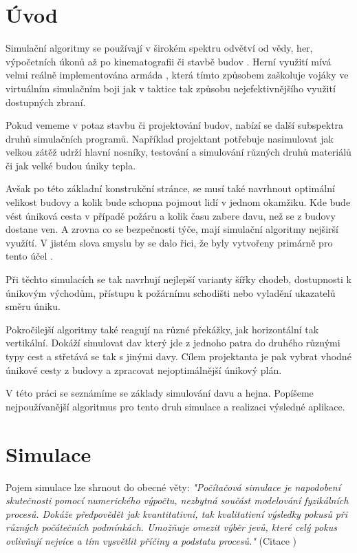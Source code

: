 \documentclass[czech,public,dept460,male,cpdeclaration]{diploma}
\begin{document}
\MakeTitlePages

\lstlistoflistings

\section{Úvod}
Simulační algoritmy se používají v širokém spektru odvětví od vědy, her, výpočetních úkonů až po kinematografii či stavbě budov \cite{linkToBuildingSimulation}. Herní využití mívá velmi reálně implementována armáda \cite{linkToArmySimulation}, která tímto způsobem zaškoluje vojáky ve virtuálním simulačním boji jak v taktice tak způsobu nejefektivnějšího využití dostupných zbraní. 

Pokud vememe v potaz stavbu či projektování budov, nabízí se další subspektra  druhů simulačních programů. Například projektant potřebuje nasimulovat jak velkou zátěž udrží hlavní nosníky, testování a simulování různých druhů materiálů či jak velké budou úniky tepla.

Avšak po této základní konstrukční stránce, se musí také navrhnout optimální velikost budovy a kolik bude schopna pojmout lidí v jednom okamžiku. Kde bude vést úniková cesta v případě požáru a kolik času zabere davu, než se z budovy dostane ven. A zrovna co se bezpečnosti týče, mají simulační algoritmy nejširší využítí. V jistém slova smyslu by se dalo řici, že byly vytvořeny primárně pro tento účel \cite{link1}.

Při těchto simulacích se tak navrhují nejlepší varianty šířky chodeb, dostupnosti k únikovým východům, přístupu k požárnímu schodišti nebo vyladění ukazatelů směru
úniku.

Pokročilejší algoritmy také reagují na různé překážky, jak horizontální tak vertikální. Dokáží simulovat dav který jde z jednoho patra do druhého různými typy cest a střetává se tak s jinými davy. Cílem projektanta je pak vybrat vhodné únikové cesty z budovy a zpracovat nejoptimálnější únikový plán.

V této práci se seznámíme se základy simulování davu a hejna. Popíšeme nejpoužívanější algoritmus \cite{link2} pro tento druh simulace a realizaci výsledné aplikace.

\section{Simulace}
Pojem simulace lze shrnout do obecné věty: \textit{"Počítačová simulace je napodobení skutečnosti pomocí numerického výpočtu, nezbytná součást modelování fyzikálních procesů. Dokáže předpovědět jak kvantitativní, tak kvalitativní výsledky pokusů při různých počátečních podmínkách. Umožňuje omezit výběr jevů, které celý pokus ovlivňují nejvíce a tím vysvětlit příčiny a podstatu procesů."} (Citace \cite{linkToSimulation})
\end{document}

